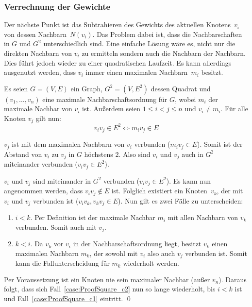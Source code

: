 \subsubsection{Verrechnung der Gewichte}
Der nächste Punkt ist das Subtrahieren des Gewichts des aktuellen Knotens~$v_i$ von dessen Nachbarn~$N(v_i)$. Das Problem dabei ist, dass die Nachbarschaften in $G$ und $G^2$ unterschiedlich sind. Eine einfache Lösung wäre es, nicht nur die direkten Nachbarn von $v_i$ zu ermitteln sondern auch die Nachbarn der Nachbarn. Dies führt jedoch wieder zu einer quadratischen Laufzeit. Es kann allerdings ausgenutzt werden, dass $v_i$ immer einen maximalen Nachbarn~$m_i$ besitzt.

\begin{Theorem}\label{theo:ijInE_iff_mjInE2}
    Es seien $G=(V,E)$ ein Graph, $G^2=(V,E^2)$ dessen Quadrat und $(v_1,\ldots,v_n)$ eine maximale Nachbarschaftsordnung für $G$, wobei $m_i$ der maximale Nachbar von $v_i$ ist. Außerdem seien $1 \leq i < j \leq n$ und $v_i \neq m_i$. Für alle Knoten $v_j$ gilt nun:
    $$v_iv_j \in E^2 \Leftrightarrow m_iv_j \in E$$
\end{Theorem}

\begin{Proof}
    \prL $v_j$ ist mit dem maximalen Nachbarn von $v_i$ verbunden ($m_iv_j \in E$). Somit ist der Abstand von $v_i$ zu $v_j$ in $G$ höchstens $2$. Also sind $v_i$ und $v_j$ auch in $G^2$ miteinander verbunden ($v_iv_j \in E^2$).
    
    \prR $v_i$ und $v_j$ sind miteinander in $G^2$ verbunden ($v_iv_j \in E^2$). Es kann nun \oBdA angenommen werden, dass $v_iv_j \notin E$ ist. Folglich existiert ein Knoten~$v_k$, der mit $v_i$ und $v_j$ verbunden ist ($v_iv_k,v_kv_j \in E$). Nun gilt es zwei Fälle zu unterscheiden:
    \begin{enumerate}
        \item \label{case:ProofSquare_c1} $i < k$. Per Definition ist der maximale Nachbar $m_i$ mit allen Nachbarn von $v_k$ verbunden. Somit auch mit $v_j$.
        
        \item \label{case:ProofSquare_c2} $k < i$. Da $v_k$ vor $v_i$ in der Nachbarschaftsordnung liegt, besitzt $v_k$ einen maximalen Nachbarn $m_k$, der sowohl mit $v_i$ also auch $v_j$ verbunden ist. Somit kann die Fallunterscheidung für $m_k$ wiederholt werden.
    \end{enumerate}
    
    Per Voraussetzung ist ein Knoten nie sein maximaler Nachbar (außer $v_n$). Daraus folgt, dass sich Fall~\ref{case:ProofSquare_c2} nun so lange wiederholt, bis $i<k$ ist und Fall~\ref{case:ProofSquare_c1} eintritt.
    \qed
\end{Proof}


